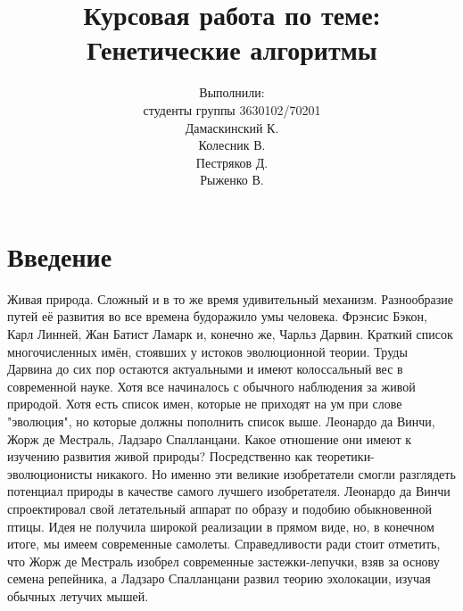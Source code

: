 


\thispagestyle{empty}


\title{Курсовая работа по теме: \\ Генетические алгоритмы}
\author{Выполнили:\\студенты группы 3630102/70201\\Дамаскинский К.\\Колесник В.\\Пестряков Д.\\Рыженко В.}
\maketitle

\pagestyle{fancy}
\fancyhf{}
\fancyfoot[C]{\thepage}
\renewcommand{\headrulewidth}{0pt}
\renewcommand{\footrulewidth}{0pt}
\tableofcontents
\pagebreak

\chapter{Введение}
Живая природа. Сложный и в то же время удивительный механизм. Разнообразие путей её развития во все времена будоражило умы человека.
Фрэнсис Бэкон, Карл Линней, Жан Батист Ламарк и, конечно же, Чарльз Дарвин. Краткий список многочисленных имён, стоявших у истоков эволюционной теории. Труды Дарвина до сих пор остаются актуальными и имеют колоссальный вес в современной науке. Хотя все начиналось с обычного наблюдения за живой природой.
Хотя есть список имен, которые не приходят на ум при слове "эволюция", но которые должны пополнить список выше. Леонардо да Винчи, Жорж де Местраль, Ладзаро Спалланцани. Какое отношение они имеют к изучению развития живой природы? Посредственно как теоретики-эволюционисты никакого. Но именно эти великие изобретатели смогли разглядеть потенциал природы в качестве самого лучшего изобретателя. Леонардо да Винчи спроектировал свой летательный аппарат по образу и подобию обыкновенной птицы. Идея не получила широкой реализации в прямом виде, но, в конечном итоге, мы имеем современные самолеты. Справедливости ради стоит отметить, что Жорж де Местраль изобрел современные застежки-лепучки, взяв за основу семена репейника, а Ладзаро Спалланцани развил теорию эхолокации, изучая обычных летучих мышей.

